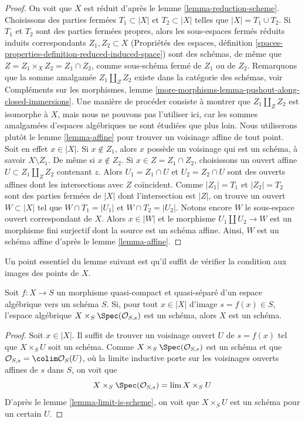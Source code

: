 \begin{proof}
On voit que $X$ est réduit d'après le lemme \ref{lemma-reduction-scheme}.
Choisissons des parties fermées $T_1 \subset |X|$ et $T_2 \subset |X|$ telles que
$|X| = T_1 \cup T_2$. Si $T_1$ et $T_2$ sont des parties fermées propres,
alors les sous-espaces fermés réduits induits correspondants $Z_1, Z_2 \subset X$
(Propriétés des espaces, définition
\ref{spaces-properties-definition-reduced-induced-space})
sont des schémas, de même que $Z = Z_1 \times_X Z_2 = Z_1 \cap Z_2$, comme sous-schéma
fermé de $Z_1$ ou de $Z_2$. Remarquons que la somme amalgamée
$Z_1 \amalg_Z Z_2$ existe dans la catégorie des schémas, voir
Compléments sur les morphismes, lemme
\ref{more-morphisms-lemma-pushout-along-closed-immersions}.
Une manière de procéder consiste à montrer que $Z_1 \amalg_Z Z_2$ est isomorphe à $X$,
mais nous ne pouvons pas l'utiliser ici, car les sommes amalgamées d'espaces
algébriques ne sont étudiées que plus loin. Nous utiliserons plutôt le
lemme \ref{lemma-affine} pour trouver un voisinage affine de tout point.
Soit en effet $x \in |X|$. Si $x \not \in Z_1$, alors $x$ possède un voisinage
qui est un schéma, à savoir $X \setminus Z_1$. De même si $x \not \in Z_2$.
Si $x \in Z = Z_1 \cap Z_2$, choisissons un ouvert affine
$U \subset Z_1 \amalg_Z Z_2$ contenant $z$. Alors $U_1 = Z_1 \cap U$
et $U_2 = Z_2 \cap U$ sont des ouverts affines dont les intersections avec
$Z$ coïncident. Comme $|Z_1| = T_1$ et $|Z_2| = T_2$ sont des parties fermées de
$|X|$ dont l'intersection est $|Z|$, on trouve un ouvert $W \subset |X|$
tel que $W \cap T_1 = |U_1|$ et $W \cap T_2 = |U_2|$. Notons encore $W$ le
sous-espace ouvert correspondant de $X$. Alors $x \in |W|$ et le morphisme
$U_1 \amalg U_2 \to W$ est un morphisme fini surjectif dont la source
est un schéma affine. Ainsi, $W$ est un schéma affine d'après le
lemme \ref{lemma-affine}.
\end{proof}

\noindent
Un point essentiel du lemme suivant est qu'il suffit de vérifier
la condition aux images des points de $X$.

\begin{lemma}
\label{lemma-enough-local}
Soit $f: X \to S$ un morphisme quasi-compact et quasi-séparé d'un
espace algébrique vers un schéma $S$. Si, pour tout $x \in |X|$ d'image
$s = f(x) \in S$, l'espace algébrique $X \times_S \Spec(\mathcal{O}_{S,s})$
est un schéma, alors $X$ est un schéma.
\end{lemma}

\begin{proof}
Soit $x \in |X|$. Il suffit de trouver un voisinage ouvert $U$ de
$s = f(x)$ tel que $X \times_S U$ soit un schéma.
Comme $X \times_S \Spec(\mathcal{O}_{S, s})$ est un schéma et que
$\mathcal{O}_{S, s} = \colim \mathcal{O}_S(U)$, où la limite inductive porte
sur les voisinages ouverts affines de $s$ dans $S$, on voit que
$$
X \times_S \Spec(\mathcal{O}_{S, s}) = \lim X \times_S U
$$
D'après le lemme \ref{lemma-limit-is-scheme}, on voit que $X \times_S U$
est un schéma pour un certain $U$.
\end{proof}

